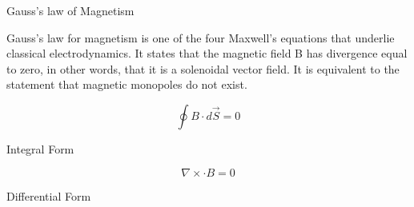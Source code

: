 

\begin{center}
Gauss's law of Magnetism
\end{center}
\begin{flushleft}
 Gauss's law for magnetism is one of the four Maxwell's equations that underlie classical electrodynamics. It states that the magnetic field B has divergence equal to zero, in other words, that it is a solenoidal vector field. It is equivalent to the statement that magnetic monopoles do not exist.
\end{flushleft}

\begin{equation}\label{Integ}
    \oint B\cdot d\overrightarrow{\! S}= 0
    \end{equation}
\begin{center}
Integral Form
\end{center}

\begin{equation}\label{Diff}
    \nabla\times \cdot{B} = 0
\end{equation}
\begin{center}
Differential Form
\end{center}





